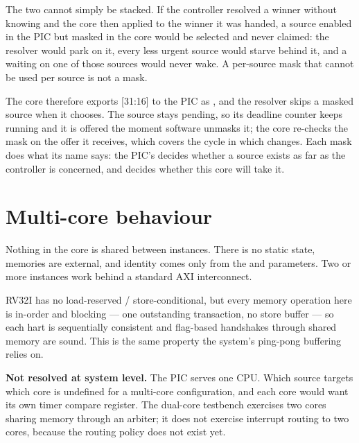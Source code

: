 The two cannot simply be stacked. If the controller resolved a winner without
knowing  and the core then applied  to the winner it was
handed, a source enabled in the PIC but masked in the core would be selected and
never claimed: the resolver would park on it, every less urgent source would
starve behind it, and a  waiting on one of those sources would never
wake. A per-source mask that cannot be used per source is not a mask.

The core therefore exports [31:16] to the PIC as , and
the resolver skips a masked source when it chooses. The source stays pending, so
its deadline counter keeps running and it is offered the moment software unmasks
it; the core re-checks the mask on the offer it receives, which covers the cycle
in which  changes. Each mask does what its name says: the PIC's
 decides whether a source exists as far as the controller is
concerned, and  decides whether this core will take it.

\section{Multi-core behaviour}

Nothing in the core is shared between instances. There is no static state,
memories are external, and identity comes only from the  and
 parameters. Two or more instances work behind a standard AXI
interconnect.

RV32I has no load-reserved / store-conditional, but every memory operation here
is in-order and blocking --- one outstanding transaction, no store buffer --- so
each hart is sequentially consistent and flag-based handshakes through shared
memory are sound. This is the same property the system's ping-pong buffering
relies on.

\begin{deviation}
\textbf{Not resolved at system level.} The PIC serves one CPU. Which source
targets which core is undefined for a multi-core configuration, and each core
would want its own timer compare register. The dual-core testbench exercises two
cores sharing memory through an arbiter; it does not exercise interrupt routing
to two cores, because the routing policy does not exist yet.
\end{deviation}
